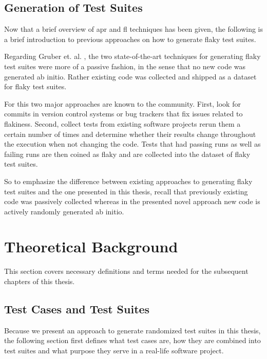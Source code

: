 \documentclass[
fancyheadings, %
%
%
]{stsreprt}
\begin{document}
\section{Generation of Test Suites}\label{sec:prev_approach}
Now that a brief overview of \acrshort{apr} and \acrshort{fl} techniques has been given, the following is a brief introduction to previous approaches on how to generate flaky test suites.\par
Regarding Gruber et. al. \cite{empirical-flaky:2021}, the two state-of-the-art techniques for generating flaky test suites were more of a passive fashion, in the sense that no new code was generated ab initio. 
Rather existing code was collected and shipped as a dataset for flaky test suites. \par
For this two major approaches are known to the community. 
First, look for commits in version control systems or bug trackers that fix issues related to flakiness. 
Second, collect tests from existing software projects rerun them a certain number of times and determine whether their results change throughout the execution when not changing the code. 
Tests that had passing runs as well as failing runs are then coined as flaky and are collected into the dataset of flaky test suites.  \par
So to emphasize the difference between existing approaches to generating flaky test suites and the one presented in this thesis, recall that previously existing code was passively collected whereas in the presented novel approach new code is actively randomly generated ab initio. 





\chapter{Theoretical Background}\label{ch:background}
This section covers necessary definitions and terms needed for the subsequent chapters of this thesis. 

\section{Test Cases and Test Suites}
Because we present an approach to generate randomized test suites in this thesis, the following section first defines what test cases are, how they are combined into test suites and what purpose they serve in a real-life software project.
\end{document}
